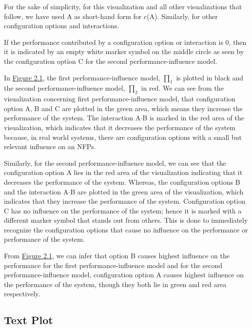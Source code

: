 For the sake of simplicity, for this visualization and all other visualizations that follow, we have used A as short-hand form for c(A).  Similarly, for other configuration options and interactions.

If the performance contributed by a configuration option or interaction is 0, then it is indicated by an empty white marker symbol on the middle circle as seen by the configuration option C for the second performance-influence model.

In \hyperref[radaPlot]{Figure 2.1}, the first performance-influence model, $\prod_1$ is plotted in black and the second performance-influence model, $\prod_2$ in red. We can see from the visualization concerning first performance-influence model, that configuration option A, B and C are plotted in the green area, which means they increase the performance of the system. The interaction A$\cdot$B is marked in the red area of the visualization, which indicates that it decreases the performance of the system because, in real world systems, there are configuration options with a small but relevant influence on an NFPs.

Similarly, for the second performance-influence model, we can see that the configuration option A lies in the red area of the visualization indicating that it decreases the performance of the system. Whereas, the configuration options B and the interaction A$\cdot$B are plotted in the green area of the visualization, which indicates that they increase the performance of the system. Configuration option C has no influence on the performance of the system; hence it is marked with a different marker symbol that stands out from others. This is done to immediately recognize the configuration options that cause no influence on the performance or performance of the system.

From \hyperref[radaPlot]{Figure 2.1}, we can infer that option B causes highest influence on the performance for the first performance-influence model and for the second performance-influence model, configuration option A causes highest influence on the performance of the system, though they both lie in green and red area  respectively. 

\subsection{Text Plot}

